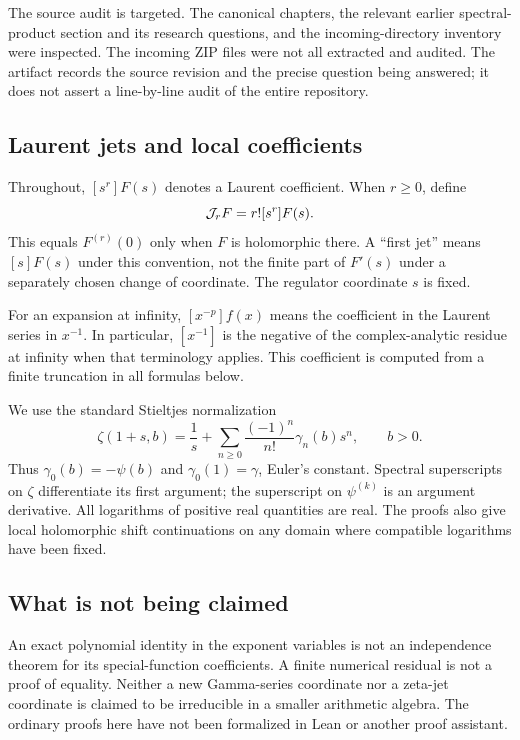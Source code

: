 The source audit is targeted. The canonical chapters, the relevant earlier
spectral-product section and its research questions, and the incoming-directory
inventory were inspected. The incoming ZIP files were not all extracted and
audited. The artifact records the source revision and the precise question being
answered; it does not assert a line-by-line audit of the entire repository.

\subsection{Laurent jets and local coefficients}
Throughout, $[s^r]F(s)$ denotes a Laurent coefficient. When $r\ge0$, define
\begin{equation}\label{asj:eq:jetdef}
 \mathcal J_r F=r![s^r]F(s).
\end{equation}
This equals $F^{(r)}(0)$ only when $F$ is holomorphic there. A ``first jet''
means $[s]F(s)$ under this convention, not the finite part of $F'(s)$ under a
separately chosen change of coordinate. The regulator coordinate $s$ is fixed.

For an expansion at infinity, $[x^{-p}]f(x)$ means the coefficient in the
Laurent series in $x^{-1}$. In particular, $[x^{-1}]$ is the negative of the
complex-analytic residue at infinity when that terminology applies. This
coefficient is computed from a finite truncation in all formulas below.

We use the standard Stieltjes normalization
\begin{equation}\label{asj:eq:stieltjes}
 \zeta(1+s,b)=\frac1s+\sum_{n\ge0}\frac{(-1)^n}{n!}\gamma_n(b)s^n,
 \qquad b>0.
\end{equation}
Thus $\gamma_0(b)=-\psi(b)$ and $\gamma_0(1)=\gamma$, Euler's constant.
Spectral superscripts on $\zeta$ differentiate its first argument; the
superscript on $\psi^{(k)}$ is an argument derivative. All logarithms of positive
real quantities are real. The proofs also give local holomorphic shift
continuations on any domain where compatible logarithms have been fixed.

\subsection{What is not being claimed}
An exact polynomial identity in the exponent variables is not an independence
theorem for its special-function coefficients. A finite numerical residual is
not a proof of equality. Neither a new Gamma-series coordinate nor a zeta-jet
coordinate is claimed to be irreducible in a smaller arithmetic algebra.
The ordinary proofs here have not been formalized in Lean or another proof
assistant.
